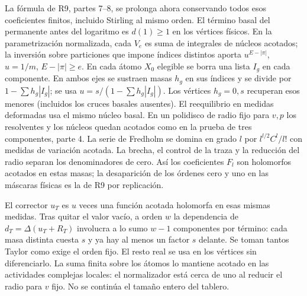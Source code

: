 La fórmula de R9, partes 7--8, se prolonga ahora conservando todos esos coeficientes
finitos, incluido Stirling al mismo orden. El término basal del permanente antes del logaritmo
es $d(1)\ge1$ en los vértices físicos. En la parametrización normalizada, cada $V_e$ es
suma de integrales de núcleos acotados; la inversión sobre particiones que impone
índices distintos aporta $u^{E-|\pi|}$, $u=1/m$, $E-|\pi|\ge e$.
En cada átomo $X_0$ elegible se borra una lista $I_g$ en cada componente. En ambos ejes se
sustraen masas $h_g$ en sus índices y se divide por $1-\sum h_g|I_g|$;
se usa $u=s/(1-\sum h_g|I_g|)$. Los vértices $h_g=0,s$ recuperan esos menores
(incluidos los cruces basales ausentes). El reequilibrio en medidas deformadas usa el
mismo núcleo basal. En un polidisco de radio fijo para $v,p$ los resolventes y los
núcleos quedan acotados como en la prueba de tres componentes, parte 4. La serie de
Fredholm se domina en grado $l$ por $l^{l/2}C^l/l!$ con medidas de variación acotada.
La brecha, el control de la traza y la reducción del radio separan los denominadores de
cero. Así los coeficientes $F_l$ son holomorfos acotados en estas masas; la desaparición
de los órdenes cero y uno en las máscaras físicas es la de R9 por replicación.

El corrector $u_T$ es $u$ veces una función acotada holomorfa en esas mismas medidas.
Tras quitar el valor vacío, a orden $w$ la dependencia de $d_T=\Delta(u_T+R_T)$
involucra a lo sumo $w-1$ componentes por término: cada masa distinta cuesta $s$ y
ya hay al menos un factor $s$ delante. Se toman tantos Taylor como exige el orden fijo.
El resto real se usa en los vértices sin diferenciarlo. La suma finita sobre los átomos
lo mantiene acotado en las actividades complejas locales: el normalizador está cerca de
uno al reducir el radio para $v$ fijo. No se continúa el tamaño entero del tablero.

